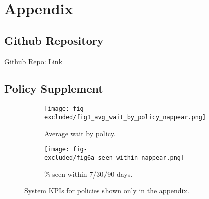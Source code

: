 \documentclass[ %
                    author={Nattanan Nawakitbamrung},
                supervisor={Dr. Sébastien Rochat},
                    degree={MSc},
                     title={Developing and Evaluating the Impact of a Single Patient Treatment List (PTL) for an NHS Integrated Care System},
                  subtitle={},
                      type={},
                      year={2025}]{dissertation}
\begin{document}

%
%

\backmatter





\appendix
\chapter{Appendix}
\label{appx:example}

\section{Github Repository}
Github Repo: \href{http://www.github.com/nattanan267/dsp-257997}{Link} 

\section{Policy Supplement}
\label{app:policy-supplement}


\begin{figure}[htbp]
  \centering
  \begin{subfigure}{0.43\linewidth}
    \centering
    \texttt{[image: fig-excluded/fig1\_avg\_wait\_by\_policy\_nappear.png]}
    \caption{Average wait by policy.}
    \label{fig:app-avg-wait}
  \end{subfigure}
  \hfill
  \begin{subfigure}{0.55\linewidth}
    \centering
    \texttt{[image: fig-excluded/fig6a\_seen\_within\_nappear.png]}
    \caption{\% seen within 7/30/90 days.}
    \label{fig:app-pct-see}
  \end{subfigure}
  \caption{System KPIs for policies shown only in the appendix.}
  \label{fig:app-sys-kpi-panels}
\end{figure}
\end{document}
